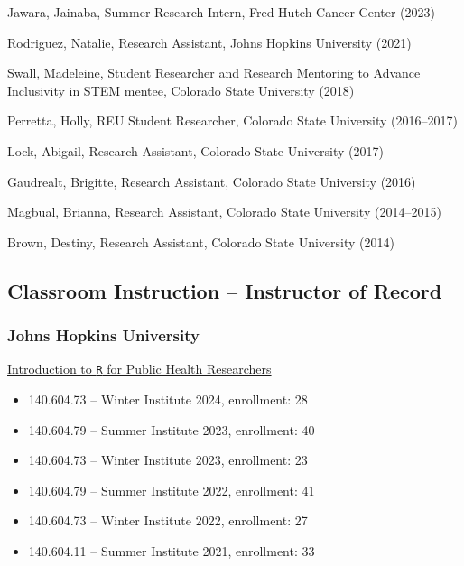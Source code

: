 \documentclass{cv}
\begin{document}
Jawara, Jainaba, Summer Research Intern, Fred Hutch Cancer Center (2023)

Rodriguez, Natalie, Research Assistant, Johns Hopkins University (2021)

Swall, Madeleine, Student Researcher and Research Mentoring to Advance Inclusivity in STEM mentee, Colorado State University (2018)

Perretta, Holly, REU Student Researcher, Colorado State University (2016--2017)

Lock, Abigail, Research Assistant, Colorado State University (2017)

Gaudrealt, Brigitte, Research Assistant, Colorado State University (2016)

Magbual, Brianna, Research Assistant, Colorado State University (2014--2015)

Brown, Destiny, Research Assistant, Colorado State University (2014)

\subsection*{Classroom Instruction -- Instructor of Record}

\subsubsection*{Johns Hopkins University}

\href{https://jhudatascience.org/intro_to_R_class/}{Introduction to \texttt{R} for Public Health Researchers}

\begin{itemize}

\item 140.604.73 -- Winter Institute 2024, enrollment: 28

\item 140.604.79 -- Summer Institute 2023, enrollment: 40

\item 140.604.73 -- Winter Institute 2023, enrollment: 23

\item 140.604.79  -- Summer Institute 2022, enrollment: 41

\item 140.604.73 -- Winter Institute 2022, enrollment: 27

\item 140.604.11 -- Summer Institute 2021, enrollment: 33

\end{itemize}
\end{document}
